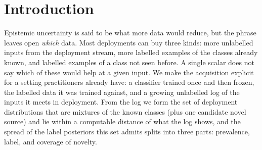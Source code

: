 \documentclass[twoside]{article}
\begin{document}

\begin{abstract}
Epistemic uncertainty is uncertainty that more data can reduce, but which data? For a frozen
classifier with a labeled reference set and additional unlabeled examples, we provide an estimated
per-input answer. From the log we form a maximum mean discrepancy ball of input densities that the log cannot
exclude, spanning prevalence mixtures of the known classes plus a slot for an unseen class. The
spread of the induced label posteriors defines three epistemic widths: prevalence, label and
coverage, each tied to a different acquisition. Under frozen class-conditionals, we characterize
how class distinguishability and support determine when more logging narrows the prevalence and
coverage widths, while the label width, fixed by the labeled reference, remains unchanged. In
controlled synthetic experiments that vary log size, labeled sample size, and label noise, we test
these responses, compare prevalence estimation with an EM-based bootstrap baseline, and check ball
inclusion together with informativeness.
\end{abstract}

\section{Introduction}
\label{sec:intro}

Epistemic uncertainty is said to be what more data would reduce, but the phrase leaves open
\emph{which} data. Most deployments can buy three kinds: more unlabelled inputs from the
deployment stream, more labelled examples of the classes already known, and labelled examples of
a class not seen before. A single scalar does not say which of these would help at a given
input. We make the acquisition explicit for a setting practitioners already
have: a classifier trained once and then frozen, the labelled data it was trained against, and a
growing unlabelled log of the inputs it meets in deployment. From the log we form the set of
deployment distributions that are mixtures of the known classes (plus one candidate novel source)
and lie within a computable distance of what the log shows, and the spread of the label
posteriors this set admits splits into three parts: prevalence, label, and coverage of novelty.
\end{document}
